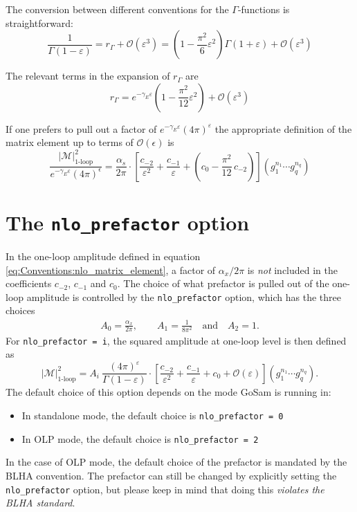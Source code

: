 \documentclass[11pt,a4paper]{refrep}
\newcommand{\gosam}{{\sc GoSam}\xspace}
\begin{document}
The conversion between different conventions for the $\Gamma$-functions
is straightforward:
\begin{equation}
\frac{1}{\Gamma(1-\varepsilon)}=r_\Gamma+{\mathcal O}(\varepsilon^3)=
\left(1-\frac{\pi^2}{6}\varepsilon^2\right)\Gamma(1+\varepsilon)
   +{\mathcal O}(\varepsilon^3)
\end{equation}

The relevant terms in the expansion of $r_\Gamma$ are
\begin{equation}
r_\Gamma=e^{-\gamma_E\varepsilon}
\left(1-\frac{\pi^2}{12}\varepsilon^2\right)+\mathcal{O}(\varepsilon^3)
\end{equation}

If one prefers to pull out a factor of
$e^{-\gamma_E\varepsilon}(4\pi)^{\varepsilon}$ the appropriate
definition of the matrix element up to terms of $\mathcal{O}(\epsilon)$ is
\begin{equation}
\frac{\left\vert\mathcal{M}\right\vert^2_{\text{1-loop}}}%
{e^{-\gamma_E\varepsilon}(4\pi)^\epsilon}=
\frac{\alpha_s}{2\pi}
\cdot\left[\frac{c_{-2}}{\varepsilon^2}+\frac{c_{-1}}{\varepsilon}
+\left(c_0-\frac{\pi^2}{12}\,c_{-2}\right)
\right](g_1^{n_1}\cdots g_q^{n_q})
\end{equation}

\section{The \texttt{nlo\_prefactor} option}
\label{sec:nlo_prefactors}
In the one-loop amplitude defined in equation \eqref{eq:Conventions:nlo_matrix_element}, a factor of $\alpha_x/2\pi$ is \emph{not} included in the coefficients $c_{-2}$, $c_{-1}$ and $c_0$. The choice of what prefactor is pulled out of the one-loop amplitude is controlled by the \texttt{nlo\_prefactor} option, which has the three choices
\begin{eqnarray}
   A_0 = \frac{\alpha_x}{2\pi}, \qquad A_1 = \frac{1}{8 \pi^2} \quad \text{and} \quad A_2 = 1.
\end{eqnarray}
For \texttt{nlo\_prefactor = i}, the squared amplitude at one-loop level is then defined as
\begin{equation}
   \left|\mathcal{M}\right|^2_{\text{1-loop}}=
A_i\ \frac{(4\pi)^\varepsilon}{\Gamma(1-\varepsilon)}
\cdot\left[\frac{c_{-2}}{\varepsilon^2}+\frac{c_{-1}}{\varepsilon}+c_0
+{\mathcal{O}}(\varepsilon)\right](g_1^{n_1}\cdots g_q^{n_q}).
\end{equation}
The default choice of this option depends on the mode \gosam is running in:
\begin{itemize}
   \item In standalone mode, the default choice is \texttt{nlo\_prefactor = 0}
   \item In OLP mode, the default choice is \texttt{nlo\_prefactor = 2}
\end{itemize}
In the case of OLP mode, the default choice of the prefactor is mandated by the BLHA convention. The prefactor can still be changed by explicitly setting the \texttt{nlo\_prefactor} option, but please keep in mind that doing this \emph{violates the BLHA standard}.
\end{document}
